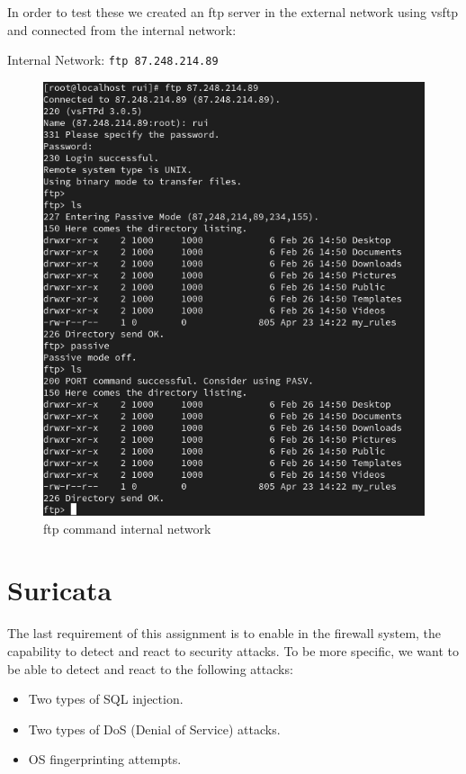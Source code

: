 \documentclass{article}
\begin{document}
In order to test these we created an ftp server in the external network using vsftp and connected from the internal network:\par
\texttt{}\par
Internal Network: \texttt{ftp 87.248.214.89} \par
\texttt{}\par
\begin{figure}[H]
    \centering
    \includegraphics[scale=0.5]{out/out_ftp_snat.png}
    \caption{ftp command internal network}
    \label{fig:network-arc}
\end{figure}




\section{Suricata}
\quad The last requirement of this assignment is to enable in the firewall system, the capability to detect and react to security attacks. To be more specific, we want to be able to detect and react to the following attacks:
\begin{itemize}
    \item Two types of SQL injection.
    \item Two types of DoS (Denial of Service) attacks.
    \item OS fingerprinting attempts.
\end{itemize}
\end{document}
